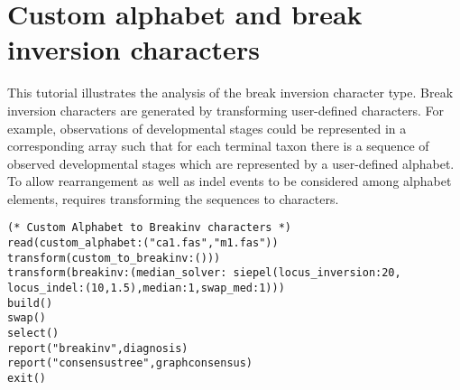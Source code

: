 \section{Custom alphabet and break inversion characters}{\label{tutorial 8}}

This tutorial illustrates the analysis of the break inversion character type.  Break inversion characters are generated by transforming user-defined  characters.  
For example, observations of developmental stages could be represented in a corresponding array such that for each terminal taxon there is a sequence of observed developmental stages which are represented by a user-defined alphabet.  To allow rearrangement as well as indel events to be considered among alphabet elements, requires transforming the  sequences to  characters. 

\begin{verbatim}
(* Custom Alphabet to Breakinv characters *)
read(custom_alphabet:("ca1.fas","m1.fas"))
transform(custom_to_breakinv:()))
transform(breakinv:(median_solver: siepel(locus_inversion:20, locus_indel:(10,1.5),median:1,swap_med:1)))
build()
swap()
select()
report("breakinv",diagnosis)
report("consensustree",graphconsensus)
exit()
\end{verbatim}

